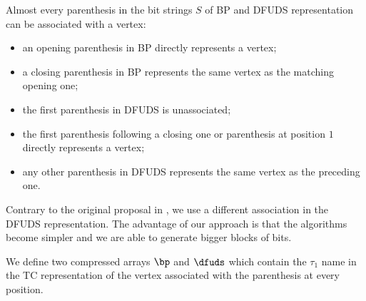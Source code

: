 Almost every parenthesis in the bit strings $S$ of BP and DFUDS representation can be associated with a vertex:
\begin{itemize}
	\item an opening parenthesis in BP directly represents a vertex;
	\item a closing parenthesis in BP represents the same vertex as the matching opening one;
	\item the first parenthesis in DFUDS is unassociated;
	\item the first parenthesis following a closing one or parenthesis at position $1$ directly represents a vertex;
	\item any other parenthesis in DFUDS represents the same vertex as the preceding one.
\end{itemize}
Contrary to the original proposal in \cite{farzan2009universal}, we use a different association in the DFUDS representation.
The advantage of our approach is that the algorithms become simpler and we are able to generate bigger blocks of bits.

We define two compressed arrays $\bp$ and $\dfuds$ which contain the $\tau_1$ name in the TC representation of the vertex associated with the parenthesis at every position.

